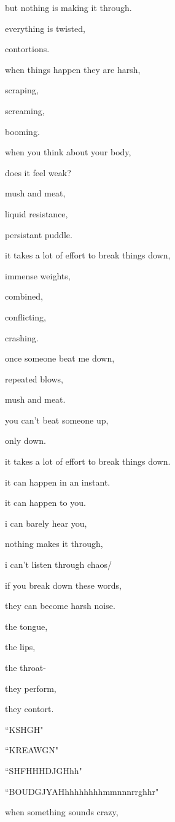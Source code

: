 \documentclass{article}
\begin{document}
	but nothing is making it through.\newpage

	everything is twisted,

	contortions.

	when things happen they are harsh,

	scraping,

	screaming,

	booming.\newpage

	when you think about your body,

	does it feel weak?

	mush and meat,

	liquid resistance,

	persistant puddle.\newpage

	it takes a lot of effort to break things down,

	immense weights,

	combined,

	conflicting,

	crashing.\newpage

	once someone beat me down,

	repeated blows,

	mush and meat.

	you can't beat someone up,

	only down.\newpage


	it takes a lot of effort to break things down.

	it can happen in an instant.

	it can happen to you.\newpage

	i can barely hear you,

	nothing makes it through,

	i can't listen through chaos/

	\newpage

	if you break down these words,

	they can become harsh noise.\newpage

	the tongue, 

	the lips,

	the throat-

	they perform,

	they contort.\newpage

	``KSHGH"

	``KREAWGN"

	``SHFHHHDJGHhh"

	``BOUDGJYAHhhhhhhhhmmnnnrrghhr"\newpage

	when something sounds crazy,
\end{document}
